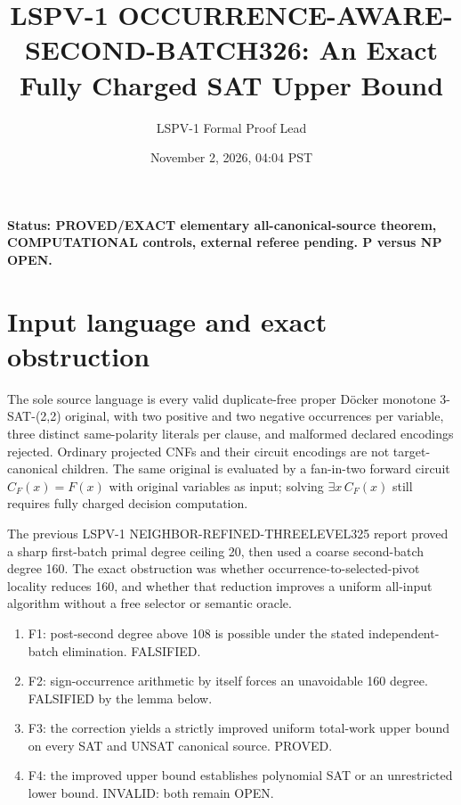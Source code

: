 \documentclass[11pt]{article}
\title{LSPV-1 OCCURRENCE-AWARE-SECOND-BATCH326: An Exact Fully Charged SAT Upper Bound}
\author{LSPV-1 Formal Proof Lead}\date{November 2, 2026, 04:04 PST}
\begin{document}
\maketitle
\noindent\textbf{Status: PROVED/EXACT elementary all-canonical-source theorem, COMPUTATIONAL controls, external referee pending. P versus NP OPEN.}
\section{Input language and exact obstruction}
The sole source language is every valid duplicate-free proper D\"ocker monotone 3-SAT-(2,2) original, with two positive and two negative occurrences per variable, three distinct same-polarity literals per clause, and malformed declared encodings rejected. Ordinary projected CNFs and their circuit encodings are not target-canonical children. The same original is evaluated by a fan-in-two forward circuit $C_F(x)=F(x)$ with original variables as input; solving $\exists x\,C_F(x)$ still requires fully charged decision computation.

The previous LSPV-1 NEIGHBOR-REFINED-THREELEVEL325 report proved a sharp first-batch primal degree ceiling 20, then used a coarse second-batch degree 160. The exact obstruction was whether occurrence-to-selected-pivot locality reduces 160, and whether that reduction improves a uniform all-input algorithm without a free selector or semantic oracle.

\begin{enumerate}
\item[] F1: post-second degree above 108 is possible under the stated independent-batch elimination. FALSIFIED.
\item[] F2: sign-occurrence arithmetic by itself forces an unavoidable 160 degree. FALSIFIED by the lemma below.
\item[] F3: the correction yields a strictly improved uniform total-work upper bound on every SAT and UNSAT canonical source. PROVED.
\item[] F4: the improved upper bound establishes polynomial SAT or an unrestricted lower bound. INVALID: both remain OPEN.
\end{enumerate}
\end{document}
